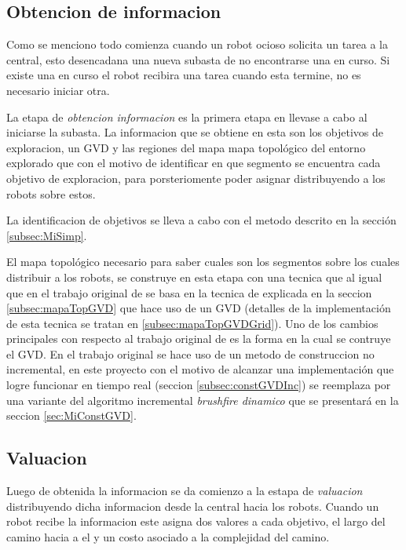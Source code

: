 \subsection{Obtencion de informacion}
Como se menciono todo comienza cuando un robot ocioso solicita un tarea a la
central, esto desencadana una nueva subasta de no encontrarse una en curso. Si
existe una en curso el robot recibira una tarea cuando esta termine, no es
necesario iniciar otra.

La etapa de \emph{obtencion informacion} es la primera etapa en llevase a cabo
al iniciarse la subasta. La informacion que se obtiene en esta son los
objetivos de exploracion, un GVD y las regiones del mapa mapa topológico del
entorno explorado que con el motivo de identificar en que segmento se encuentra
cada objetivo de exploracion, para porsteriomente poder asignar distribuyendo a
los robots sobre estos. 

La identificacion de objetivos se lleva a cabo con el metodo descrito en la
sección \ref{subsec:MiSimp}.

El mapa topológico necesario para saber cuales son los segmentos sobre
los cuales distribuir a los robots, se construye en esta etapa con una
tecnica que al igual que en el trabajo original de
\cite{wurm2008coordinated} se basa en la tecnica de \cite{Thrun1998}
explicada en la seccion \ref{subsec:mapaTopGVD} que hace uso de 
un GVD (detalles de la implementación de esta tecnica se tratan en
\ref{subsec:mapaTopGVDGrid}). Uno de los cambios principales con
respecto al trabajo original de \cite{wurm2008coordinated} es la forma
en la cual se contruye el GVD. En el trabajo original se hace uso de un
metodo de construccion no incremental, en este proyecto con el motivo de
alcanzar una implementación que logre funcionar en tiempo real (seccion
\ref{subsec:constGVDInc}) se reemplaza por una variante del algoritmo
incremental \emph{brushfire dinamico} que se presentará en la seccion
\ref{sec:MiConstGVD}.


\subsection{Valuacion} \label{subsec:MiValSub}

Luego de obtenida la informacion se da comienzo a la estapa de \emph{valuacion}
distribuyendo dicha informacion desde la central hacia los robots. Cuando un
robot recibe la informacion este asigna dos valores a cada objetivo, el largo
del camino hacia a el y un costo asociado a la complejidad del camino.

